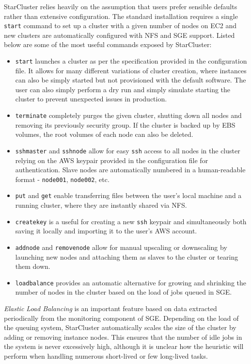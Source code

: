 StarCluster relies heavily on the assumption that users prefer sensible defaults rather than extensive configuration. The standard installation requires a single \verb|start| command to set up a cluster with a given number of nodes on EC2 and new clusters are automatically configured with NFS and SGE support. Listed below are some of the most useful commands exposed by StarCluster:
\begin{itemize}
	\item \verb|start| launches a cluster as per the specification provided in the configuration file. It allows for many different variations of cluster creation, where instances can also be simply started but not provisioned with the default software. The user can also simply perform a dry run and simply simulate starting the cluster to prevent unexpected issues in production.
	\item \verb|terminate| completely purges the given cluster, shutting down all nodes and removing its previously security group. If the cluster is backed up by EBS volumes, the root volumes of each node can also be deleted.
	\item \verb|sshmaster| and \verb|sshnode| allow for easy \verb|ssh| access to all nodes in the cluster relying on the AWS keypair provided in the configuration file for authentication. Slave nodes are automatically numbered in a human-readable format - \verb|node001|, \verb|node002|, etc.
	\item \verb|put| and \verb|get| enable transferring files between the user's local machine and a running cluster, where they are instantly shared via NFS.
	\item \verb|createkey| is a useful for creating a new \verb|ssh| keypair and simultaneously both saving it locally and importing it to the user's AWS account.
	\item \verb|addnode| and \verb|removenode| allow for manual upscaling or downscaling by launching new nodes and attaching them as slaves to the cluster or tearing them down.
	\item \verb|loadbalance| provides an automatic alternative for growing and shrinking the number of nodes in the cluster based on the load of jobs queued in SGE.
\end{itemize}

\textit{Elastic Load Balancing} is an important feature based on data extracted periodically from the monitoring component of SGE. Depending on the load of the queuing system, StarCluster automatically scales the size of the cluster by adding or removing instance nodes. This ensures that the number of idle jobs in the system is never excessively high, although it is unclear how the heuristic will perform when handling numerous short-lived or few long-lived tasks. 

